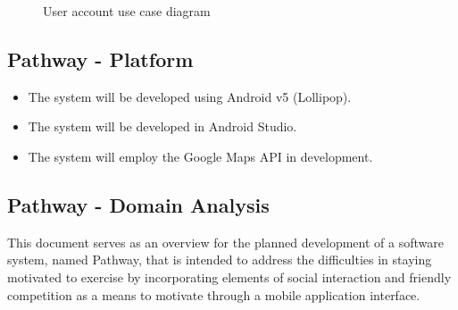﻿\documentclass{article}
\begin{document}
\begin{figure}[H]
    \centering
    \begin{center}
    \end{center}
    \caption{User account use case diagram}
    \label{fig:my_label}
\end{figure}

\newpage

\subsection{Pathway - Platform}
\begin{itemize}
    \item The system will be developed using Android v5 (Lollipop).
    \item The system will be developed in Android Studio.
    \item The system will employ the Google Maps API in development.
\end{itemize}

\subsection{Pathway - Domain Analysis}
This document serves as an overview for the planned development of a software system, named Pathway, that is intended to address the difficulties in staying motivated to exercise by incorporating elements of social interaction and friendly competition as a means to motivate through a mobile application interface.
\end{document}
